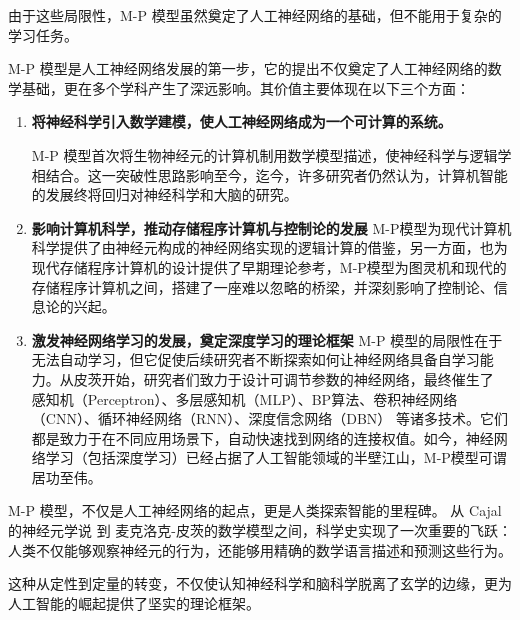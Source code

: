 由于这些局限性，M-P 模型虽然奠定了人工神经网络的基础，但不能用于复杂的学习任务。

 M-P 模型是人工神经网络发展的第一步，它的提出不仅奠定了人工神经网络的数学基础，更在多个学科产生了深远影响。其价值主要体现在以下三个方面：
\begin{enumerate}
\item {\bf 将神经科学引入数学建模，使人工神经网络成为一个可计算的系统。 }  

M-P 模型首次将生物神经元的计算机制用数学模型描述，使神经科学与逻辑学相结合。这一突破性思路影响至今，迄今，许多研究者仍然认为，计算机智能的发展终将回归对神经科学和大脑的研究。

\item {\bf  影响计算机科学，推动存储程序计算机与控制论的发展 } 
M-P模型为现代计算机科学提供了由神经元构成的神经网络实现的逻辑计算的借鉴，另一方面，也为现代存储程序计算机的设计提供了早期理论参考，M-P模型为图灵机和现代的存储程序计算机之间，搭建了一座难以忽略的桥梁，并深刻影响了控制论、信息论的兴起。

\item {\bf  激发神经网络学习的发展，奠定深度学习的理论框架} 
M-P 模型的局限性在于无法自动学习，但它促使后续研究者不断探索如何让神经网络具备自学习能力。从皮茨开始，研究者们致力于设计可调节参数的神经网络，最终催生了 感知机（Perceptron）、多层感知机（MLP）、BP算法、卷积神经网络（CNN）、循环神经网络（RNN）、深度信念网络（DBN） 等诸多技术。它们都是致力于在不同应用场景下，自动快速找到网络的连接权值。如今，神经网络学习（包括深度学习）已经占据了人工智能领域的半壁江山，M-P模型可谓居功至伟。
\end{enumerate}

M-P 模型，不仅是人工神经网络的起点，更是人类探索智能的里程碑。
从 Cajal 的神经元学说 到 麦克洛克-皮茨的数学模型之间，科学史实现了一次重要的飞跃：人类不仅能够观察神经元的行为，还能够用精确的数学语言描述和预测这些行为。

这种从定性到定量的转变，不仅使认知神经科学和脑科学脱离了玄学的边缘，更为人工智能的崛起提供了坚实的理论框架。

